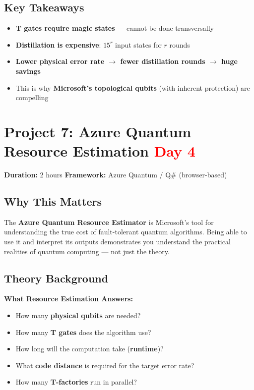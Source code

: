 \documentclass[11pt,a4paper]{article}
\begin{document}
\subsection*{Key Takeaways}
\begin{itemize}
    \item \textbf{T gates require magic states} --- cannot be done transversally
    \item \textbf{Distillation is expensive}: $15^r$ input states for $r$ rounds
    \item \textbf{Lower physical error rate $\to$ fewer distillation rounds $\to$ huge savings}
    \item This is why \textbf{Microsoft's topological qubits} (with inherent protection) are compelling
\end{itemize}


\section{Project 7: Azure Quantum Resource Estimation \hfill \textcolor{red}{\textbf{Day 4}}}

\begin{questionbox}
\textbf{Duration:} 2 hours \quad \textbf{Framework:} Azure Quantum / Q\# (browser-based)
\end{questionbox}

\subsection*{Why This Matters}
The \textbf{Azure Quantum Resource Estimator} is Microsoft's tool for understanding the true cost of fault-tolerant quantum algorithms. Being able to use it and interpret its outputs demonstrates you understand the practical realities of quantum computing --- not just the theory.

\subsection*{Theory Background}
\textbf{What Resource Estimation Answers:}
\begin{itemize}
    \item How many \textbf{physical qubits} are needed?
    \item How many \textbf{T gates} does the algorithm use?
    \item How long will the computation take (\textbf{runtime})?
    \item What \textbf{code distance} is required for the target error rate?
    \item How many \textbf{T-factories} run in parallel?
\end{itemize}
\end{document}
